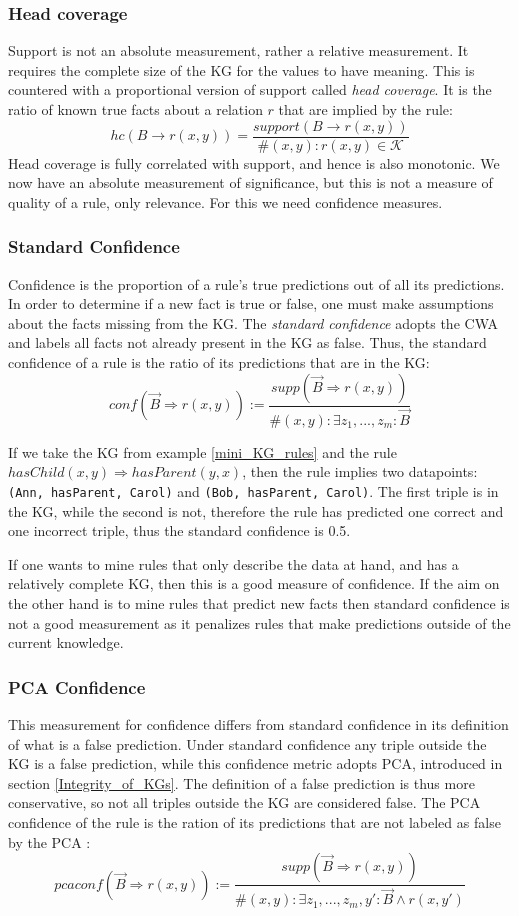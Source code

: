 \subsubsection{Head coverage}
Support is not an absolute measurement, rather a relative measurement. It requires the complete size of the KG for the values to have meaning. This is countered with a proportional version of support called \emph{head coverage}. It is the ratio of known true facts about a relation $r$ that are implied by the rule:
\[hc(B \rightarrow r(x,y)) = \frac{support(B \rightarrow r(x,y))}{\#(x, y) : r(x, y) \in \mathcal{K}}\]
Head coverage is fully correlated with support, and hence is also monotonic. We now have an absolute measurement of significance, but this is not a measure of quality of a rule, only relevance. For this we need confidence measures.


\subsubsection{Standard Confidence} Confidence is the proportion of a rule's true predictions out of all its predictions. In order to determine if a new fact is true or false, one must make assumptions about the facts missing from the KG. The \textit{standard confidence} adopts the CWA and labels all facts not already present in the KG as false. Thus, the standard confidence of a rule is the ratio of its predictions that are in the KG:
\[conf(\vec{B}\Rightarrow r(x, y)) := \frac{supp(\vec{B}\Rightarrow r(x, y))}{\#(x, y):\exists z_1 ,..., z_m : \vec{B}}\]

If we take the KG from example \ref{mini_KG_rules} and the rule $hasChild(x, y) \Rightarrow hasParent(y, x)$, then the rule implies two datapoints: \texttt{(Ann, hasParent, Carol)} and \texttt{(Bob, hasParent, Carol)}. The first triple is in the KG, while the second is not, therefore the rule has predicted one correct and one incorrect triple, thus the standard confidence is 0.5.


If one wants to mine rules that only describe the data at hand, and has a relatively complete KG, then this is a good measure of confidence. If the aim on the other hand is to mine rules that predict new facts then standard confidence is not a good measurement as it penalizes rules that make predictions outside of the current knowledge.


\subsubsection{PCA Confidence}
This measurement for confidence differs from standard confidence in its definition of what is a false prediction. Under standard confidence any triple outside the KG is a false prediction, while this confidence metric adopts PCA, introduced in section \ref{Integrity_of_KGs}. The definition of a false prediction is thus more conservative, so not all triples outside the KG are considered false. The PCA confidence of the rule is the ration of its predictions that are not labeled as false by the PCA \cite{amie}:
\[pcaconf(\vec{B}\Rightarrow r(x, y)) := \frac{supp(\vec{B}\Rightarrow r(x, y))}{\#(x, y):\exists z_1 ,..., z_m, y' : \vec{B} \wedge r(x, y')}\]


